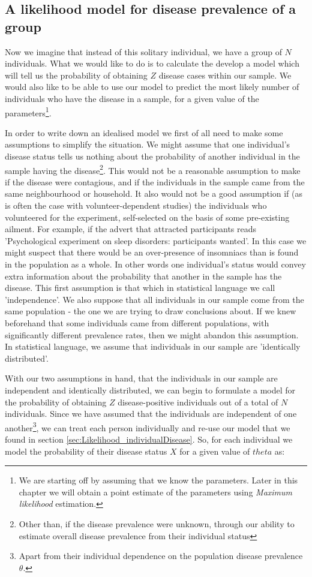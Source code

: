 \documentclass[11pt,fullpage]{book}
\begin{document}
\subsection{A likelihood model for disease prevalence of a group}\label{sec:Likelihood_diseaseGroup}
Now we imagine that instead of this solitary individual, we have a group of $N$ individuals. What we would like to do is to calculate the develop a model which will tell us the probability of obtaining $Z$ disease cases within our sample. We would also like to be able to use our model to predict the most likely number of individuals who have the disease in a sample, for a given value of the parameters\footnote{We are starting off by assuming that we know the parameters. Later in this chapter we will obtain a point estimate of the parameters using \textit{Maximum likelihood} estimation.}. 

In order to write down an idealised model we first of all need to make some assumptions to simplify the situation. We might assume that one individual's disease status tells us nothing about the probability of another individual in the sample having the disease\footnote{Other than, if the disease prevalence were unknown, through our ability to estimate overall disease prevalence from their individual status}. This would not be a reasonable assumption to make if the disease were contagious, and if the individuals in the sample came from the same neighbourhood or household. It also would not be a good assumption if (as is often the case with volunteer-dependent studies) the individuals who volunteered for the experiment, self-selected on the basis of some pre-existing ailment. For example, if the advert that attracted participants reads 'Psychological experiment on sleep disorders: participants wanted'. In this case we might suspect that there would be an over-presence of insomniacs than is found in the population as a whole. In other words one individual's status would convey extra information about the probability that another in the sample has the disease. This first assumption is that which in statistical language we call 'independence'. We also suppose that all individuals in our sample come from the same population - the one we are trying to draw conclusions about. If we knew beforehand that some individuals came from different populations, with significantly different prevalence rates, then we might abandon this assumption. In statistical language, we assume that individuals in our sample are 'identically distributed'.

With our two assumptions in hand, that the individuals in our sample are independent and identically distributed, we can begin to formulate a model for the probability of obtaining $Z$ disease-positive individuals out of a total of $N$ individuals. Since we have assumed that the individuals are independent of one another\footnote{Apart from their individual dependence on the population disease prevalence $\theta$.}, we can treat each person individually and re-use our model that we found in section \ref{sec:Likelihood_individualDisease}. So, for each individual we model the probability of their disease status $X$ for a given value of $theta$ as:
\end{document}
